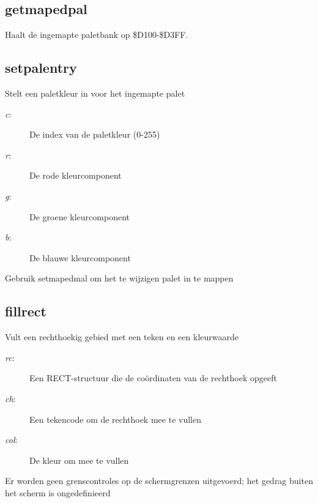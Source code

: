 \subsection{getmapedpal}
\begin{description}[leftmargin=2.4cm,style=nextline]
\item [Beschrijving:] {Haalt de ingemapte  paletbank op \$D100-\$D3FF.}\item [Syntaxis:] 
\end{description}

\subsection{setpalentry}
\begin{description}[leftmargin=2.4cm,style=nextline]
\item [Beschrijving:] {Stelt een paletkleur in voor het ingemapte palet}\item [Syntaxis:] \item [Parameters:]
\begin{description}
\item [{\em c}:] {De index van de paletkleur (0-255)}\item [{\em r}:] {De rode kleurcomponent}\item [{\em g}:] {De groene kleurcomponent}\item [{\em b}:] {De blauwe kleurcomponent}
\end{description}
\item [Opmerkingen:] {Gebruik setmapedmal om het te wijzigen palet in te mappen}
\end{description}

\subsection{fillrect}
\begin{description}[leftmargin=2.4cm,style=nextline]
\item [Beschrijving:] {Vult een rechthoekig gebied met een teken en een kleurwaarde}\item [Syntaxis:] \item [Parameters:]
\begin{description}
\item [{\em rc}:] {Een RECT-structuur die de coördinaten van de rechthoek opgeeft}\item [{\em ch}:] {Een tekencode om de rechthoek mee te vullen}\item [{\em col}:] {De kleur om mee te vullen}
\end{description}
\item [Opmerkingen:] {Er worden geen grenscontroles op de schermgrenzen uitgevoerd; het gedrag buiten het scherm is ongedefinieerd}
\end{description}

